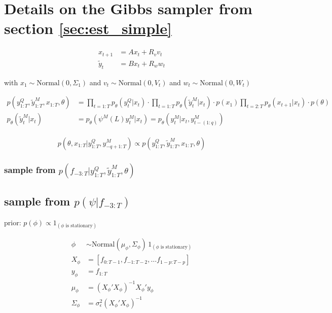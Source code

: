
\chapter{Details on the Gibbs sampler from section \ref{sec:est_simple}}

\begin{align}
x_{t+1} &= A x_t + R_v v_t \\
\tilde{y}_t &= B x_t + R_w w_t
\end{align}

with $x_1 \sim \mathrm{Normal}(0, \Sigma_1)$ and $v_t \sim \mathrm{Normal}(0, V_t)$ and $w_t \sim \mathrm{Normal}(0, W_t)$

\begin{align}
p(y^Q_{1:T}, \tilde{y}^M_{1:T}, x_{1:T}, \theta) &= \prod_{t=1:T}p_\theta(y^Q_t|x_t) \cdot \prod_{t=1:T}p_\theta(\tilde{y}^M_t|x_t) \cdot p(x_1) \prod_{t=2:T}p_\theta(x_{t+1}|x_t) \cdot p(\theta) \\
p_\theta(\tilde{y}^M_t|x_t) &= p_\theta(\psi^M(L)y^M_t|x_t) = p_\theta(y^M_t|x_t, y^M_{t-(1:q)})
\end{align}

\begin{align}
p(\theta, x_{1:T}|y^Q_{1:T}, y^M_{-q+1:T}) \propto p(y^Q_{1:T}, \tilde{y}^M_{1:T}, x_{1:T}, \theta)
\end{align}

\subsection*{sample from $p(f_{-3:T}|y^Q_{1:T}, \tilde{y}^M_{1:T}, \theta)$}

\section{sample from $p(\psi|f_{-3:T})$}

prior: $p(\phi) \propto 1_{(\phi\text{ is stationary})}$

\begin{align}
\phi &\sim \mathrm{Normal}(\mu_\phi, \Sigma_\phi)\,1_{(\phi\text{ is stationary})} \\
X_\phi &= [f_{0:T-1}, f_{-1:T-2}, \dots f_{1-p:T-p}] \\
y_\phi &= f_{1:T} \\
\mu_\phi &= (X_\phi'X_\phi)^{-1}X_\phi'y_\phi \\
\Sigma_\phi &= \sigma_\epsilon^2 (X_\phi'X_\phi)^{-1}
\end{align}

